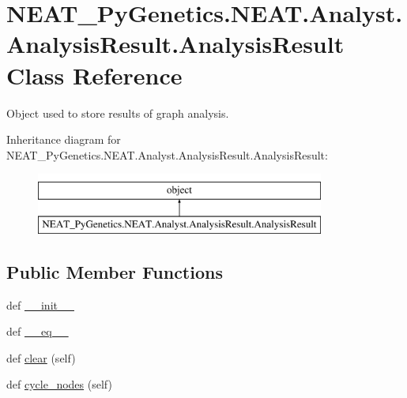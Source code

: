 \hypertarget{classNEAT__PyGenetics_1_1NEAT_1_1Analyst_1_1AnalysisResult_1_1AnalysisResult}{}\section{N\+E\+A\+T\+\_\+\+Py\+Genetics.\+N\+E\+A\+T.\+Analyst.\+Analysis\+Result.\+Analysis\+Result Class Reference}
\label{classNEAT__PyGenetics_1_1NEAT_1_1Analyst_1_1AnalysisResult_1_1AnalysisResult}


Object used to store results of graph analysis.  


Inheritance diagram for N\+E\+A\+T\+\_\+\+Py\+Genetics.\+N\+E\+A\+T.\+Analyst.\+Analysis\+Result.\+Analysis\+Result\+:\begin{figure}[H]
\begin{center}
\leavevmode
\includegraphics[height=2.000000cm]{classNEAT__PyGenetics_1_1NEAT_1_1Analyst_1_1AnalysisResult_1_1AnalysisResult}
\end{center}
\end{figure}
\subsection*{Public Member Functions}
\begin{DoxyCompactItemize}
\item 
def \hyperlink{classNEAT__PyGenetics_1_1NEAT_1_1Analyst_1_1AnalysisResult_1_1AnalysisResult_a76e2ba4c3bec7e93ab1c78e281a8504d}{\+\_\+\+\_\+init\+\_\+\+\_\+}
\item 
def \hyperlink{classNEAT__PyGenetics_1_1NEAT_1_1Analyst_1_1AnalysisResult_1_1AnalysisResult_a6145154aa0f23413e57312a78cc12f91}{\+\_\+\+\_\+eq\+\_\+\+\_\+}
\item 
def \hyperlink{classNEAT__PyGenetics_1_1NEAT_1_1Analyst_1_1AnalysisResult_1_1AnalysisResult_abc4627be334a397f27b8173cb4a21796}{clear} (self)
\item 
def \hyperlink{classNEAT__PyGenetics_1_1NEAT_1_1Analyst_1_1AnalysisResult_1_1AnalysisResult_ad3a9bbe518536d18882346d8ee9dd28e}{cycle\+\_\+nodes} (self)
\end{DoxyCompactItemize}
